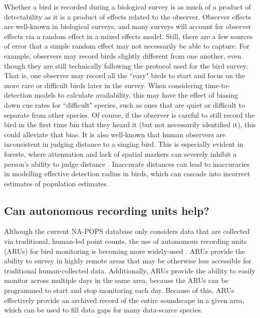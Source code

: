 \par Whether a bird is recorded during a biological survey is as much of a product of detectability as it is a product of effects related to the observer.
Observer effects are well-known in biological surveys, and many surveys will account for observer effects via a random effect in a mixed effects model.
Still, there are a few sources of error that a simple random effect may not necessarily be able to capture.
For example, observers may record birds slightly different from one another, even though they are still technically following the protocol used for the bird survey.
That is, one observer may record all the ``easy" birds to start and focus on the more rare or difficult birds later in the survey.
When considering time-to-detection models to calculate availability, this may have the effect of biasing down cue rates for ``difficult" species, such as ones that are quiet or difficult to separate from other species.
Of course, if the observer is careful to still record the bird in the first time bin that they heard it (but not necessarily identified it), this could alleviate that bias.
It is also well-known that human observers are inconsistent in judging distance to a singing bird.
This is especially evident in forests, where attenuation and lack of spatial markers can severely inhibit a person's ability to judge distance \citep{alldredge_field_2007}.
Inaccurate distances can lead to inaccuracies in modelling effective detection radius in birds, which can cascade into incorrect estimates of population estimates.

\subsection{Can autonomous recording units help?}

\par Although the current NA-POPS database only considers data that are collected via traditional, human-led point counts, the use of autonomous recording units (ARUs) for bird monitoring is becoming more widely-used \citep{perezgranados_estimating_2021, shonfield_autonomous_2017, sugai_terrestrial_2019}.
ARUs provide the ability to survey in highly remote areas that may be otherwise less accessible for traditional human-collected data.
Additionally, ARUs provide the ability to easily monitor across multiple days in the same area, because the ARUs can be programmed to start and stop monitoring each day.
Because of this, ARUs effectively provide an archived record of the entire soundscape in a given area, which can be used to fill data gaps for many data-scarce species.

